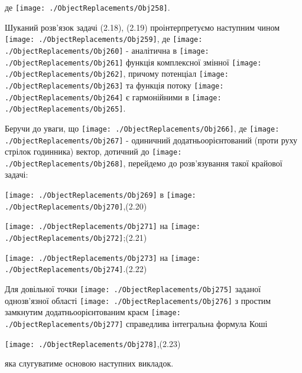 де
\texttt{[image: ./ObjectReplacements/Obj258]}.

Шуканий розв'язок задачі (2.18), (2.19) проінтерпретуємо наступним чином
\texttt{[image: ./ObjectReplacements/Obj259]},
де
\texttt{[image: ./ObjectReplacements/Obj260]}
- аналітична в
\texttt{[image: ./ObjectReplacements/Obj261]}
функція комплексної змінної
\texttt{[image: ./ObjectReplacements/Obj262]},
причому потенціал
\texttt{[image: ./ObjectReplacements/Obj263]}
та функція потоку
\texttt{[image: ./ObjectReplacements/Obj264]}
є гармонійними в
\texttt{[image: ./ObjectReplacements/Obj265]}.

Беручи до уваги, що
\texttt{[image: ./ObjectReplacements/Obj266]},
де
\texttt{[image: ./ObjectReplacements/Obj267]}
- одиничний додатньоорієнтований (проти руху стрілок годинника) вектор,
дотичний до
\texttt{[image: ./ObjectReplacements/Obj268]},
перейдемо до розв'язування такої крайової задачі:

\texttt{[image: ./ObjectReplacements/Obj269]}
в
\texttt{[image: ./ObjectReplacements/Obj270]},(2.20)

\texttt{[image: ./ObjectReplacements/Obj271]}
на
\texttt{[image: ./ObjectReplacements/Obj272]};(2.21)

\texttt{[image: ./ObjectReplacements/Obj273]}
на
\texttt{[image: ./ObjectReplacements/Obj274]}.(2.22)

Для довільної точки
\texttt{[image: ./ObjectReplacements/Obj275]}
заданої однозв'язної області
\texttt{[image: ./ObjectReplacements/Obj276]}
з простим замкнутим додатньоорієнтованим краєм
\texttt{[image: ./ObjectReplacements/Obj277]}
справедлива інтегральна формула Коші

\texttt{[image: ./ObjectReplacements/Obj278]},(2.23)

яка слугуватиме основою наступних викладок.

